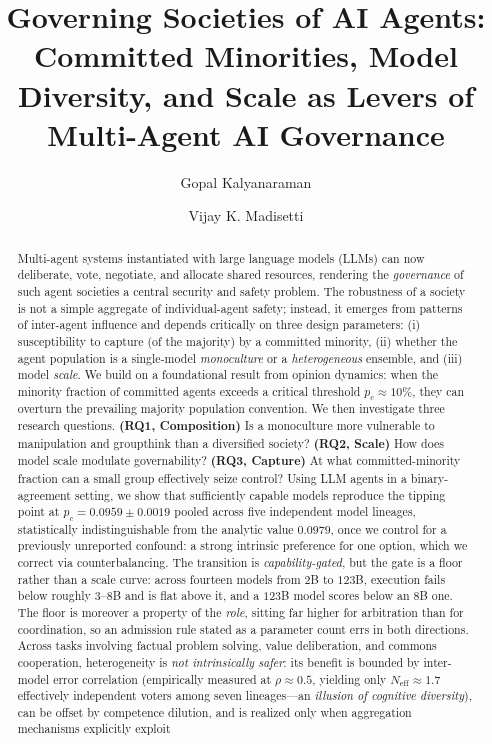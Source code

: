 \documentclass[manuscript,screen,review]{acmart}
\begin{document}
\title{Governing Societies of AI Agents: Committed Minorities, Model Diversity, and Scale as Levers of Multi-Agent AI Governance}

\author{Gopal Kalyanaraman}

\author{Vijay K. Madisetti}

\renewcommand{\shortauthors}{Kalyanaraman and Madisetti}

\begin{abstract}
Multi-agent systems instantiated with large language models (LLMs) can now deliberate, vote, negotiate, and allocate shared resources, rendering the \emph{governance} of such agent societies a central security and safety problem. The robustness of a society is not a simple aggregate of individual-agent safety; instead, it emerges from patterns of inter-agent influence and depends critically on three design parameters: (i) susceptibility to capture (of the majority) by a committed minority, (ii) whether the agent population is a single-model \emph{monoculture} or a \emph{heterogeneous} ensemble, and (iii) model \emph{scale}. We build on a foundational result from opinion dynamics: when the minority fraction of committed agents exceeds a critical threshold $p_c \approx 10\%$, they can overturn the prevailing majority population convention. We then investigate three research questions. \textbf{(RQ1, Composition)} Is a monoculture more vulnerable to manipulation and groupthink than a diversified society? \textbf{(RQ2, Scale)} How does model scale modulate governability? \textbf{(RQ3, Capture)} At what committed-minority fraction can a small group effectively seize control? Using LLM agents in a binary-agreement setting, we show that sufficiently capable models reproduce the tipping point at $p_c = 0.0959 \pm 0.0019$ pooled across five independent model lineages, statistically indistinguishable from the analytic value $0.0979$, once we control for a previously unreported confound: a strong intrinsic preference for one option, which we correct via counterbalancing. The transition is \emph{capability-gated}, but the gate is a floor rather than a scale curve: across fourteen models from $2$B to $123$B, execution fails below roughly $3$--$8$B and is flat above it, and a $123$B model scores below an $8$B one. The floor is moreover a property of the \emph{role}, sitting far higher for arbitration than for coordination, so an admission rule stated as a parameter count errs in both directions. Across tasks involving factual problem solving, value deliberation, and commons cooperation, heterogeneity is \emph{not intrinsically safer}: its benefit is bounded by inter-model error correlation (empirically measured at $\rho \approx 0.5$, yielding only $N_{\mathrm{eff}} \approx 1.7$ effectively independent voters among seven lineages—an \emph{illusion of cognitive diversity}), can be offset by competence dilution, and is realized only when aggregation mechanisms explicitly exploit 
\end{abstract}
\end{document}
